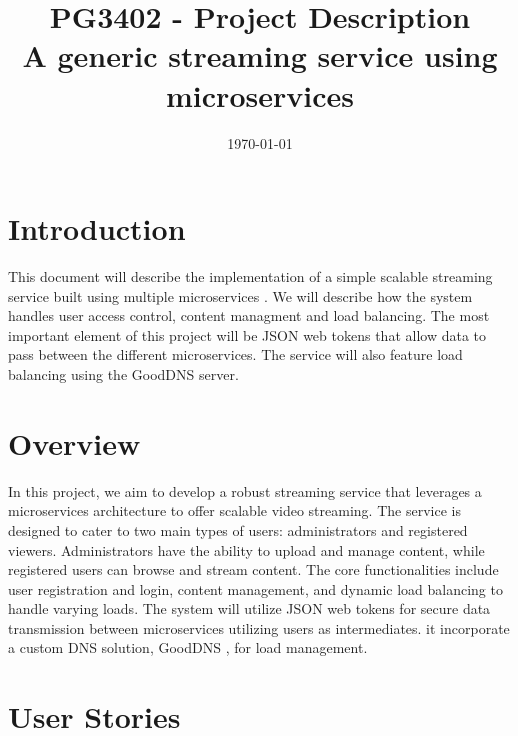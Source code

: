 \documentclass[12pt]{article}
\title{\textbf{PG3402 - Project Description} \\ A generic streaming service using microservices}
\date{\today}
\begin{document}
\subsectionfont{\fontsize{12}{14}\selectfont}

\maketitle

\pagebreak

\tableofcontents



\section{Introduction}
This document will describe the implementation of a 
simple scalable streaming service built using multiple microservices \cite{Microservices2024}.
We will describe how the system handles user access control, content managment and load balancing.
The most important element of this project will be JSON web tokens\cite{jonesJSONWebToken2015} 
that allow data to pass between the different microservices. 
The service will also feature load balancing using the GoodDNS server\cite{heimonenSlenderman00GoodDns2023}.

\section{Overview} 
In this project, we aim to develop a robust streaming service that leverages a microservices architecture to offer 
scalable video streaming. The service is designed to cater to two main types of users: 
administrators and registered viewers. Administrators have the ability to upload and manage content, 
while registered users can browse and stream content.
The core functionalities include user registration and login, 
content management, and dynamic load balancing to handle varying loads. 
The system will utilize JSON web tokens for secure data transmission between 
microservices utilizing users as intermediates. 
it incorporate a custom DNS solution, 
GoodDNS \cite{heimonenSlenderman00GoodDns2023}, for load management.



\section{User Stories}
\end{document}
